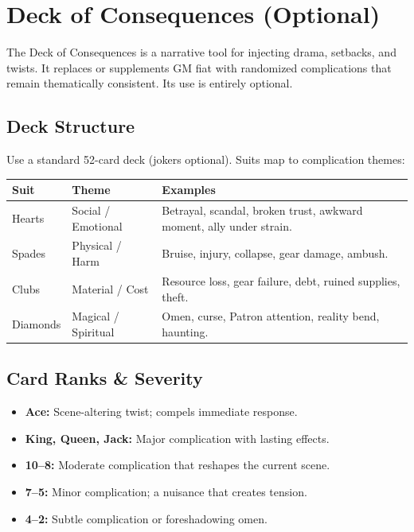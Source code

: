 
\section{Deck of Consequences (Optional)}

The Deck of Consequences is a narrative tool for injecting drama, setbacks, and twists. It replaces or supplements GM fiat with randomized complications that remain thematically consistent. Its use is entirely optional.

\subsection{Deck Structure}

Use a standard 52-card deck (jokers optional). Suits map to complication themes:

\begin{tabular}{@{}llp{8cm}@{}}
\toprule
\textbf{Suit} & \textbf{Theme} & \textbf{Examples} \\
\midrule
Hearts   & Social / Emotional & Betrayal, scandal, broken trust, awkward moment, ally under strain. \\
Spades   & Physical / Harm & Bruise, injury, collapse, gear damage, ambush. \\
Clubs    & Material / Cost & Resource loss, gear failure, debt, ruined supplies, theft. \\
Diamonds & Magical / Spiritual & Omen, curse, Patron attention, reality bend, haunting. \\
\bottomrule
\end{tabular}

\subsection{Card Ranks \& Severity}

\begin{itemize}
  \item \textbf{Ace:} Scene-altering twist; compels immediate response.
  \item \textbf{King, Queen, Jack:} Major complication with lasting effects.
  \item \textbf{10--8:} Moderate complication that reshapes the current scene.
  \item \textbf{7--5:} Minor complication; a nuisance that creates tension.
  \item \textbf{4--2:} Subtle complication or foreshadowing omen.
\end{itemize}

